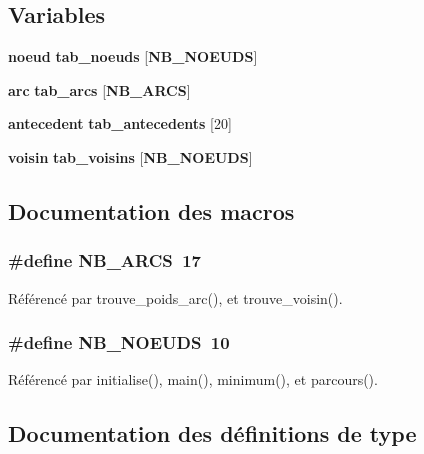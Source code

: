 \subsection*{Variables}
\begin{DoxyCompactItemize}
\item 
{\bf noeud} {\bf tab\+\_\+noeuds} [{\bf N\+B\+\_\+\+N\+O\+E\+U\+DS}]
\item 
{\bf arc} {\bf tab\+\_\+arcs} [{\bf N\+B\+\_\+\+A\+R\+CS}]
\item 
{\bf antecedent} {\bf tab\+\_\+antecedents} [20]
\item 
{\bf voisin} {\bf tab\+\_\+voisins} [{\bf N\+B\+\_\+\+N\+O\+E\+U\+DS}]
\end{DoxyCompactItemize}


\subsection{Documentation des macros}
\subsubsection[{N\+B\+\_\+\+A\+R\+CS}]{\setlength{\rightskip}{0pt plus 5cm}\#define N\+B\+\_\+\+A\+R\+CS~17}\label{dijkstra_8h_a19b678a5ffe40bc8fc4e374f4c18b605}


Référencé par trouve\+\_\+poids\+\_\+arc(), et trouve\+\_\+voisin().

\subsubsection[{N\+B\+\_\+\+N\+O\+E\+U\+DS}]{\setlength{\rightskip}{0pt plus 5cm}\#define N\+B\+\_\+\+N\+O\+E\+U\+DS~10}\label{dijkstra_8h_af1fc50eb3549e02b274f975c008628e7}


Référencé par initialise(), main(), minimum(), et parcours().



\subsection{Documentation des définitions de type}
